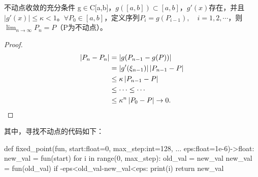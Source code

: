 \begin{theo}{不动点收敛的充分条件}
g$\in$C[a,b]，$g([a,b])\subset[a,b]$，$g'(x)$存在，并且$\left|g'(x)\right|\leq\kappa <1$。$\forall P_0\in[a,b]$，定义序列$P_i=g(P_{i-1}),\quad i=1,2,\cdots$，则$\lim_{n\rightarrow\infty}P_n=P$（P为不动点）。
\end{theo}
\begin{proof}
    \begin{align*}
        \left|P_n-P_n\right| &= \left|g(P_{n-1}-g(P))\right| \\
        &= \left|g'(\xi_{n-1})\right|\left|P_{n-1}-P\right| \\
        &\leq \kappa\left|P_{n-1}-P\right| \\
        &\leq \cdots \leq \cdots \\
        &\leq \kappa^n\left|P_0-P\right| \rightarrow 0.
    \end{align*}
\end{proof}\par
其中，寻找不动点的代码如下：
\begin{python}
def fixed_point(fun, start:float=0, max_step:int=128, ...
    eps:float=1e-6)->float:
    new_val = fun(start)
    for i in range(0, max_step):
        old_val = new_val
        new_val = fun(old_val)
        if -eps<old_val-new_val<eps:
            print(i)
            return new_val
\end{python}








